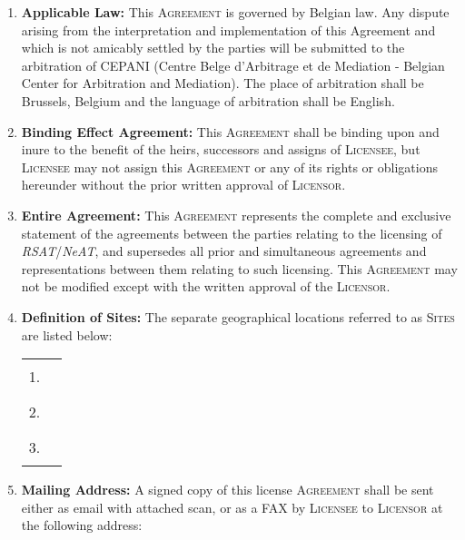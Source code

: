 \documentclass[12pt]{article}
\newcommand{\RSAT}[0]{\emph{RSAT}\xspace}
\newcommand{\NeAT}[0]{\emph{NeAT}\xspace}
\newcommand{\Licensor}[0]{\textsc{Licensor}\xspace}
\newcommand{\Licensee}[0]{\textsc{Licensee}\xspace}
\newcommand{\Agreement}[0]{\textsc{Agreement}\xspace}
\newcommand{\Sites}[0]{\textsc{Sites}\xspace}
\newcommand{\Fillline}[0]{\rule{10cm}{1pt}}
\newcommand{\Paragraph}[2]{\item \textbf{#1:} #2}
\begin{document}
\begin{enumerate}
{%
  }

  \Paragraph{Applicable Law}{This \Agreement is governed by Belgian law. Any
    dispute arising from the interpretation and implementation of this
    Agreement and which is not amicably settled by the parties will be
    submitted to the arbitration of CEPANI (Centre Belge d'Arbitrage et de
    Mediation - Belgian Center for Arbitration and Mediation). The place
    of arbitration shall be Brussels, Belgium and the language of
    arbitration shall be English.

  }

  \Paragraph{Binding Effect Agreement}{This \Agreement shall be
    binding upon and inure to the benefit of the heirs, successors and
    assigns of \Licensee, but \Licensee may not assign this \Agreement
    or any of its rights or obligations hereunder without the prior
    written approval of \Licensor.  }

  \Paragraph{Entire Agreement}{This \Agreement represents the complete
    and exclusive statement of the agreements between the parties
    relating to the licensing of \RSAT/\NeAT, and supersedes all prior
    and simultaneous agreements and representations between them
    relating to such licensing. This \Agreement may not be modified
    except with the written approval of the \Licensor.  }

  \Paragraph{Definition of Sites}{
    The separate geographical locations 
    referred to as \Sites are listed below:

\begin{center}
\begin{tabular}{ll}
1.&\Fillline\\[5mm]
2.&\Fillline\\[5mm]
3.&\Fillline
\end{tabular}
\end{center}
}
\label{DefSites}


\Paragraph{Mailing Address}{A signed copy of this license \Agreement
  shall be sent either as email with attached scan, or as a FAX by \Licensee to
  \Licensor at the following address:

}
\end{enumerate}
\end{document}
